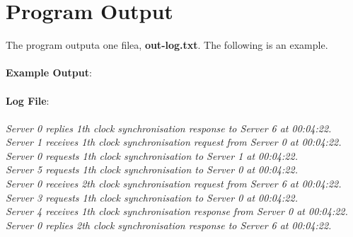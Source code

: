 \documentclass[a4paper,12pt]{report}
\begin{document}
\section{Program Output}
The program outputa one filea, \textbf{out-log.txt}. The following is an example.\\\\
\textbf{Example Output}:\\\\
\textbf{Log File}:\\\\
\textit{Server 0 replies 1th clock synchronisation response to Server 6 at 00:04:22.\\
Server 1 receives 1th clock synchronisation request from Server 0 at 00:04:22.\\
Server 0 requests 1th clock synchronisation to Server 1 at 00:04:22.\\
Server 5 requests 1th clock synchronisation to Server 0 at 00:04:22.\\
Server 0 receives 2th clock synchronisation request from Server 6 at 00:04:22.\\
Server 3 requests 1th clock synchronisation to Server 0 at 00:04:22.\\
Server 4 receives 1th clock synchronisation response from Server 0 at 00:04:22.\\
Server 0 replies 2th clock synchronisation response to Server 6 at 00:04:22.\\}\\\\

\newpage
\end{document}
